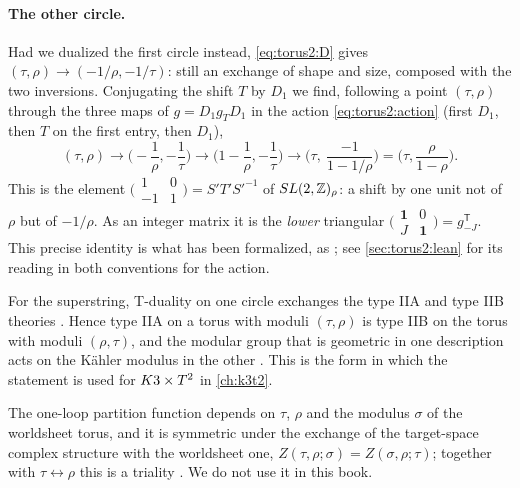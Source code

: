 \paragraph{The other circle.} Had we dualized the first circle instead, \eqref{eq:torus2:D}
gives $(\tau,\rho)\to(-1/\rho,-1/\tau)$: still an exchange of shape and size, composed with
the two inversions. Conjugating the shift $T$ by $D_1$ we find, following a point
$(\tau,\rho)$ through the three maps of $g=D_1g_TD_1$ in the action \eqref{eq:torus2:action}
(first $D_1$, then $T$ on the first entry, then $D_1$),
\begin{equation}\label{eq:torus2:D1TD1}
 (\tau,\rho)\to\Big(-\frac1\rho,-\frac1\tau\Big)\to\Big(1-\frac1\rho,-\frac1\tau\Big)
 \to\Big(\tau,\ \frac{-1}{1-1/\rho}\Big)=\Big(\tau,\frac{\rho}{1-\rho}\Big).
\end{equation}
This is the element
$\big(\begin{smallmatrix}1&0\\-1&1\end{smallmatrix}\big)=S'T'S'^{-1}$ of $SL(2,\mathbb{Z})_\rho$: a
shift by one unit not of $\rho$ but of $-1/\rho$. As an integer matrix it is the
\emph{lower} triangular
$\big(\begin{smallmatrix}\mathbf 1&0\\J&\mathbf 1\end{smallmatrix}\big)=g_{-J}^{\mathsf T}$.
This precise identity is what has been formalized, as ;
see \cref{sec:torus2:lean} for its reading in both conventions for the action.

\begin{remark}
For the superstring, T-duality on one circle exchanges the type IIA and type IIB theories
. Hence type IIA on a torus with moduli
$(\tau,\rho)$ is type IIB on the torus with moduli $(\rho,\tau)$, and the modular group that
is geometric in one description acts on the K\"ahler modulus in the other
. This is the form in which the statement is used for
$K3\times T^2$ in \cref{ch:k3t2}.
\end{remark}

\begin{remark}
The one-loop partition function depends on $\tau$, $\rho$ and the modulus $\sigma$ of the
worldsheet torus, and it is symmetric under the exchange of the target-space complex
structure with the worldsheet one, $Z(\tau,\rho;\sigma)=Z(\sigma,\rho;\tau)$; together with
$\tau\leftrightarrow\rho$ this is a triality  \TL. We do not use it in this book.
\end{remark}

